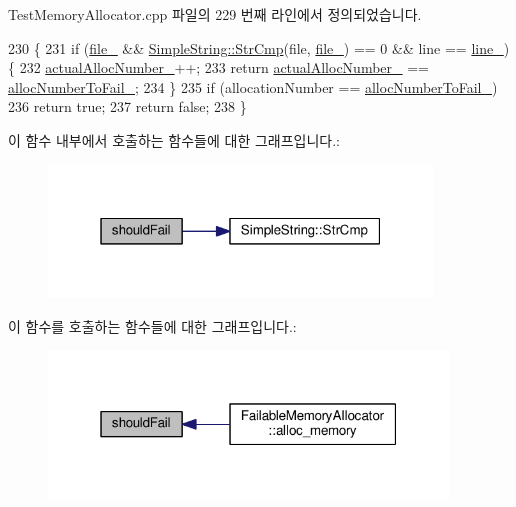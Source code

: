 Test\+Memory\+Allocator.\+cpp 파일의 229 번째 라인에서 정의되었습니다.


\begin{DoxyCode}
230     \{
231       \textcolor{keywordflow}{if} (\hyperlink{class_location_to_fail_alloc_node_a1f340748cdde8f8781fa62b4a3562190}{file\_} && \hyperlink{class_simple_string_a0b7a8ae895cbde84a491b42c43de23a6}{SimpleString::StrCmp}(file, \hyperlink{class_location_to_fail_alloc_node_a1f340748cdde8f8781fa62b4a3562190}{file\_}) == 0 && line == 
      \hyperlink{class_location_to_fail_alloc_node_ac515e5f5602db49593f96316f1b5c054}{line\_}) \{
232         \hyperlink{class_location_to_fail_alloc_node_adaf74e319a99b1e58c27cb006936108a}{actualAllocNumber\_}++;
233         \textcolor{keywordflow}{return} \hyperlink{class_location_to_fail_alloc_node_adaf74e319a99b1e58c27cb006936108a}{actualAllocNumber\_} == \hyperlink{class_location_to_fail_alloc_node_af455eff2e2a9cca9706893914495d60c}{allocNumberToFail\_};
234       \}
235       \textcolor{keywordflow}{if} (allocationNumber == \hyperlink{class_location_to_fail_alloc_node_af455eff2e2a9cca9706893914495d60c}{allocNumberToFail\_})
236         \textcolor{keywordflow}{return} \textcolor{keyword}{true};
237       \textcolor{keywordflow}{return} \textcolor{keyword}{false};
238     \}
\end{DoxyCode}


이 함수 내부에서 호출하는 함수들에 대한 그래프입니다.\+:
\nopagebreak
\begin{figure}[H]
\begin{center}
\leavevmode
\includegraphics[width=289pt]{class_location_to_fail_alloc_node_a2690f4527e513193a643ef3aed06e3e5_cgraph}
\end{center}
\end{figure}




이 함수를 호출하는 함수들에 대한 그래프입니다.\+:
\nopagebreak
\begin{figure}[H]
\begin{center}
\leavevmode
\includegraphics[width=301pt]{class_location_to_fail_alloc_node_a2690f4527e513193a643ef3aed06e3e5_icgraph}
\end{center}
\end{figure}




